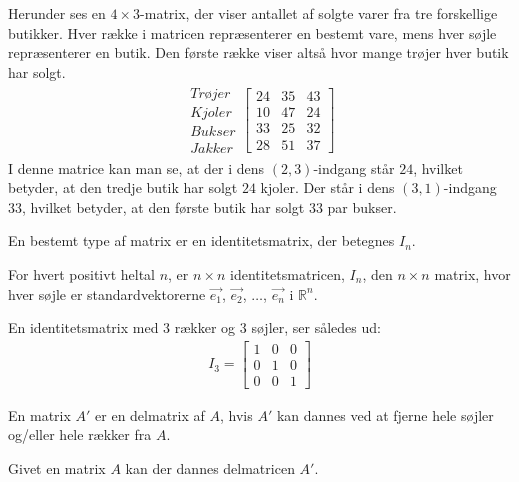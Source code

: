 \begin{eks}
Herunder ses en $4 \times 3$-matrix, der viser antallet af solgte varer fra tre forskellige butikker. Hver række i matricen repræsenterer en bestemt vare, mens hver søjle repræsenterer en butik. Den første række viser altså hvor mange trøjer hver butik har solgt.
\begin{align*}
\begin{matrix}
	Trøjer \\
	Kjoler \\
	Bukser \\
	Jakker
\end{matrix}
\begin{bmatrix}
	24 & 35 & 43 \\
	10 & 47 & 24 \\
	33 & 25 & 32 \\
	28 & 51 & 37
\end{bmatrix}
\end{align*}
I denne matrice kan man se, at der i dens $(2,3)$-indgang står $24$, hvilket betyder, at den tredje butik har solgt $24$ kjoler. Der står i dens $(3,1)$-indgang $33$, hvilket betyder, at den første butik har solgt $33$ par bukser.
\end{eks}

En bestemt type af matrix er en identitetsmatrix, der betegnes $I_n$. 

\begin{defn}\label{def:imatrix}
For hvert positivt heltal $n$, er $n \times n$ identitetsmatricen, $I_n$, den $n \times n$ matrix, hvor hver søjle er standardvektorerne $\vec{e_1}$, $\vec{e_2}$, $\dots$, $\vec{e_n}$ i $\mathbb{R}^n$.
\end{defn}

En identitetsmatrix med $3$ rækker og $3$ søjler, ser således ud:
\begin{align*}
I_3 = \begin{bmatrix}
	1 & 0 & 0 \\
	0 & 1 & 0 \\
	0 & 0 & 1 
\end{bmatrix}
\end{align*}

\begin{defn}\label{delmatrix}
En matrix $A'$ er en delmatrix af $A$, hvis $A'$ kan dannes ved at fjerne hele søjler og/eller hele rækker fra $A$.
\end{defn}

Givet en matrix $A$ kan der dannes delmatricen $A'$.

